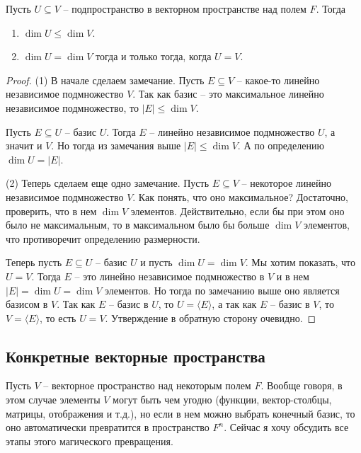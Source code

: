 \begin{claim}
Пусть $U\subseteq V$ -- подпространство в векторном пространстве над полем $F$.
Тогда
\begin{enumerate}
\item $\dim U \leqslant \dim V$.

\item $\dim U = \dim V$ тогда и только тогда, когда $U = V$.
\end{enumerate}
\end{claim}
\begin{proof}
(1) В начале сделаем замечание.
Пусть $E\subseteq V$ -- какое-то линейно независимое подмножество $V$.
Так как базис -- это максимальное линейно независимое подмножество, то $|E|\leqslant \dim V$.

Пусть $E\subseteq U$ -- базис $U$.
Тогда $E$ -- линейно независимое подмножество $U$, а значит и $V$.
Но тогда из замечания выше $|E|\leqslant \dim V$.
А по определению $\dim U = |E|$.

 (2) Теперь сделаем еще одно замечание.
 Пусть $E\subseteq V$ -- некоторое линейно независимое подмножество $V$.
 Как понять, что оно максимальное?
Достаточно, проверить, что в нем $\dim V$ элементов.
Действительно, если бы при этом оно было не максимальным, то в максимальном было бы больше $\dim V$ элементов, что противоречит определению размерности.
 
Теперь пусть $E\subseteq U$ -- базис $U$ и пусть $\dim U = \dim V$.
Мы хотим показать, что $ U = V$.
Тогда $E$ -- это линейно независимое подмножество в $V$ и в нем $|E| = \dim U = \dim V$ элементов.
Но тогда по замечанию выше оно является базисом в $V$.
Так как $E$ -- базис в $U$, то $U = \langle E \rangle$, а так как $E$ -- базис в $V$, то $V = \langle E \rangle$, то есть $U= V$.
Утверждение в обратную сторону очевидно.
\end{proof}

\subsection{Конкретные векторные пространства}
\label{subsection::FnSpace}

Пусть $V$ -- векторное пространство над некоторым полем $F$.
Вообще говоря, в этом случае элементы $V$ могут быть чем угодно (функции, вектор-столбцы, матрицы, отображения и т.д.), но если в нем можно выбрать конечный базис, то оно автоматически превратится в пространство $F^n$.
Сейчас я хочу обсудить все этапы этого магического превращения.

